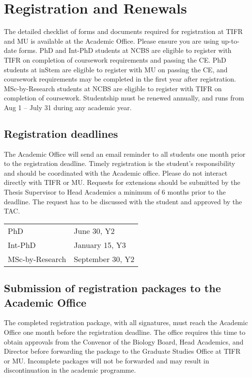 \documentclass[a4paper]{extarticle}
\begin{document}
\section{Registration and Renewals}

The detailed checklist of forms and documents required for registration at TIFR and MU is
available at the Academic Office. Please ensure you are using up-to-date forms. PhD and
Int-PhD students at NCBS are eligible to register with TIFR on completion of coursework
requirements and passing the CE. PhD students at inStem are eligible to register with MU on
passing the CE, and coursework requirements may be completed in the first year after
registration. MSc-by-Research students at NCBS are eligible to register with TIFR on
completion of coursework. Studentship must be renewed annually, and runs from Aug 1 –
July 31 during any academic year.

\subsection{Registration deadlines}
The Academic Office will send an email reminder to all students
one month prior to the registration deadline. Timely registration is the student’s
responsibility and should be coordinated with the Academic office. Please do not interact
directly with TIFR or MU. Requests for extensions should be submitted by the Thesis
Supervisor to Head Academics a minimum of 6 months prior to the deadline. The request
has to be discussed with the student and approved by the TAC.

\begin{tabular}{l l}
PhD & June 30, Y2 \\
Int-PhD & January 15, Y3 \\
MSc-by-Research & September 30, Y2 
\end{tabular} \newline

\subsection{Submission of registration packages to the Academic Office}
The completed registration
package, with all signatures, must reach the Academic Office one month before the
registration deadline. The office requires this time to obtain approvals from the Convenor of
the Biology Board, Head Academics, and Director before forwarding the package to the
Graduate Studies Office at TIFR or MU. Incomplete packages will not be forwarded and
may result in discontinuation in the academic programme.
\end{document}
